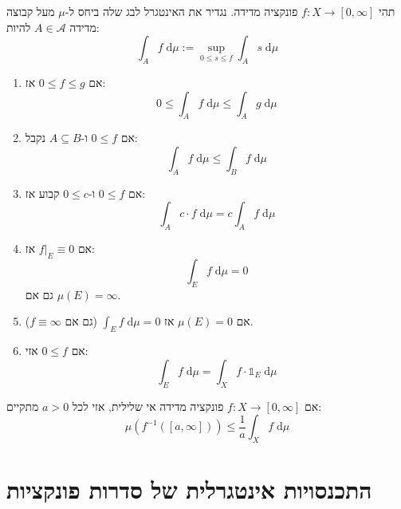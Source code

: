 \documentclass{tstextbook}
\begin{document}
\begin{definition}
תהי \(f:X\to \left[ 0,\infty \right]\) פונקציה מדידה. נגדיר את האינטגרל לבג שלה ביחס ל-\(\mu\) מעל קבוצה מדידה \(A \in \mathcal{ A}\) להיות:
$$\int _{A}f \;\mathrm{d} \mu := \sup _{0\leq s \leq f} \int _{A}s \;\mathrm{d} \mu $$

\end{definition}
\begin{proposition}
  \begin{enumerate}
    \item אם \(0\leq f\leq g\) אז: 
$$0\leq \int _{A}f \;\mathrm{d} \mu \leq \int _{A}g \;\mathrm{d} \mu $$


    \item אם \(0\leq f\) ו-\(A\subseteq B\) נקבל: 
$$\int _{A}f \;\mathrm{d} \mu \leq \int _{B} f\;\mathrm{d} \mu  $$


    \item אם \(0\leq f\) ו-\(0\leq c\) קבוע אז: 
$$\int _{A} c\cdot f  \;\mathrm{d} \mu= c \int _{A}f \;\mathrm{d} \mu  $$


    \item אם \(f|_{E}\equiv 0\) אז: 
$$\int _{E}f \;\mathrm{d} \mu=0 $$
גם אם \(\mu(E)=\infty\).


    \item אם \(\mu(E)=0\) אז \(\int _{E}f \;\mathrm{d} \mu=0\) (גם אם \(f  \equiv \infty\)). 


    \item אם \(0\leq f\) אזי: 
$$\int _{E}f \;\mathrm{d} \mu=\int _{X}f \cdot \mathbb{1} _{E} \;\mathrm{d} \mu  $$


  \end{enumerate}
\end{proposition}
\begin{proposition}
אם \(f:X\to \left[ 0,\infty \right]\) פונקציה מדידה אי שלילית, אזי לכל \(a> 0\) מתקיים:
$$\mu\left( f^{-1}\left( \left[ a,\infty \right] \right) \right)\leq \frac{1}{a}\int _{X}f\;\mathrm{d} \mu $$

\end{proposition}
\section{התכנסויות אינטגרלית של סדרות פונקציות}
\end{document}
